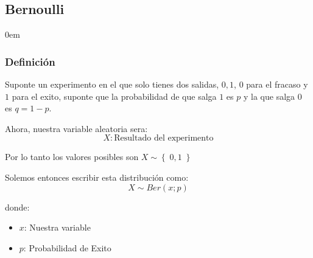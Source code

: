 \documentclass[12pt, fleqn]{report}                             %
\newenvironment{SmallIndentation}[1][0.75em]                    %
        {\begin{adjustwidth}{#1}{}\begin{footnotesize}}             %
        {\end{footnotesize}\end{adjustwidth}}                       %
\theoremstyle{break}                                            %
\newcommand{\Set}[1]{\left\{ \; #1 \; \right\}}                 %
\begin{document}
            \subsection{Bernoulli}

                \begin{multicols}{2}
                \begin{SmallIndentation}[0em]

                    \subsubsection{Definición}

                        Suponte un experimento en el que solo tienes dos salidas, 
                        $0, 1$, $0$ para el fracaso y $1$ para el exito,
                        suponte que la probabilidad de que salga $1$ es $p$
                        y la que salga $0$ es $q = 1 - p$.

                        Ahora, nuestra variable aleatoria sera:
                        \begin{equation*}
                            X : \text{Resultado del experimento}
                        \end{equation*}

                        Por lo tanto los valores posibles son $X \sim \Set{0, 1}$

                        Solemos entonces escribir esta distribución como:
                        \begin{equation*}
                            X \sim Ber(x; p)
                        \end{equation*}

                        donde:
                        \begin{itemize}
                            \item $x$: Nuestra variable
                            \item $p$: Probabilidad de Exito
                        \end{itemize}



\end{SmallIndentation}
\end{multicols}
\end{document}
